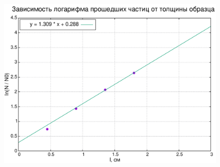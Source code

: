 \documentclass[%
reprint,
amsmath,amssymb,
aps,
]{revtex4-2}
\begin{document}
	\begin{figure}[]
		\includegraphics[width=\linewidth]{ratio-length-pb.pdf}
	\end{figure}
	
	
	
\end{document}
